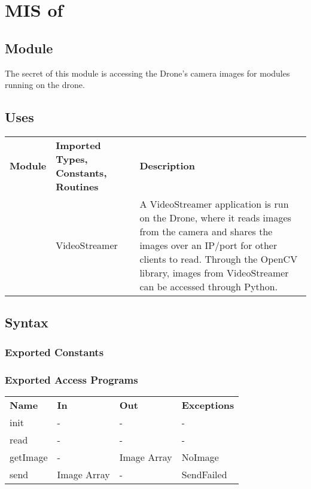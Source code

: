 \documentclass[12pt, titlepage]{article}
\begin{document}
\section{MIS of } \label{MIS_DRONE_CAMERA} 
\subsection{Module}
The secret of this module is accessing the Drone's camera images for modules running on the drone.
\subsection{Uses}
\begin{center}
\begin{tabular}{p{2 cm} p{5cm} p{6.5cm} } 
\hline
\textbf{Module} & \textbf{Imported Types, Constants, Routines} & \textbf{Description} \\
\nameref{GStreamer} & VideoStreamer & A VideoStreamer application is run on the Drone, where it reads images from the camera and shares the images over an IP/port for other clients to read. Through the OpenCV library, images from VideoStreamer can be accessed through Python. \\
\hline
\hline
\end{tabular}
\end{center}
\subsection{Syntax}
\subsubsection{Exported Constants}
\subsubsection{Exported Access Programs}
\begin{center}
\begin{tabular}{p{3.5cm} p{2.5cm} p{2.5cm} p{5cm}} 
\hline
\textbf{Name} & \textbf{In} & \textbf{Out} & \textbf{Exceptions} \\
init & - & - & - \\
read & - & - & - \\
getImage & - & Image Array & NoImage \\
send & Image Array & - & SendFailed \\
\hline
\hline
\end{tabular}
\end{center}
\end{document}
